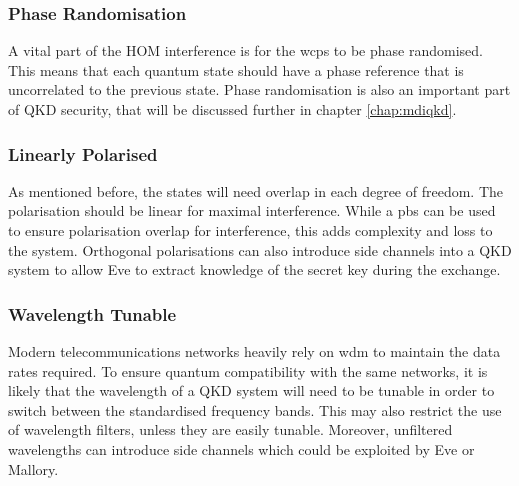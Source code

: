 
\subsubsection*{Phase Randomisation}

A vital part of the \ac{HOM} interference is for the \acp{wcp} to be phase randomised. This means that each quantum state should have a phase reference that is uncorrelated to the previous state. Phase randomisation is also an important part of \ac{QKD} security, that will be discussed further in chapter \ref{chap:mdiqkd}.



\subsubsection*{Linearly Polarised}

As mentioned before, the states will need overlap in each degree of freedom. The polarisation should be linear for maximal interference. While a \ac{pbs} can be used to ensure polarisation overlap for interference, this adds complexity and loss to the system. Orthogonal polarisations can also introduce side channels into a \ac{QKD} system to allow Eve to extract knowledge of the secret key during the exchange.

\subsubsection*{Wavelength Tunable}

Modern telecommunications networks heavily rely on \ac{wdm} to maintain the data rates required. To ensure quantum compatibility with the same networks, it is likely that the wavelength of a \ac{QKD} system will need to be tunable in order to switch between the standardised frequency bands. This may also restrict the use of wavelength filters, unless they are easily tunable. Moreover, unfiltered wavelengths can introduce side channels which could be exploited by Eve or Mallory.

